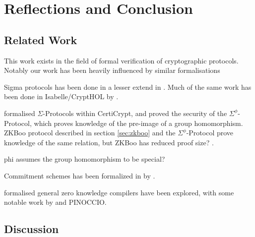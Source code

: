 \chapter{Reflections and Conclusion}
\label{sec:reflection_conclusion}

\section{Related Work}
\label{sec:related_work}

This work exists in the field of formal verification of cryptographic protocols.
Notably our work has been heavily influenced by similar formalisations
\cite{cryptoeprint:2019:1185,DBLP:journals/corr/MetereD17,certicrypt_sigma,zkcrypt,Yao}

Sigma protocols has been done in a lesser extend in \easycrypt. Much of the same
work has been done in Isabelle/CryptHOL by \citeauthor{cryptoeprint:2019:1185}.

\citeauthor{certicrypt_sigma} formalised $\Sigma$-Protocols within CertiCrypt,
and proved the security of the $\Sigma^{\phi}$-Protocol, which proves knowledge
of the pre-image of a group homomorphism. ZKBoo protocol described in section
\ref{sec:zkboo} and the $\Sigma^{\phi}$-Protocol prove knowledge of the same
relation, but ZKBoo has reduced proof size? .

phi assumes the group homomorphism to be special?


Commitment schemes has been formalized in \easycrypt by
\citeauthor{DBLP:journals/corr/MetereD17}.


formalised general zero knowledge compilers have been explored, with some
notable work by \citeauthor{zkcrypt} and PINOCCIO.



\section{Discussion}
\label{sec:discussion}



